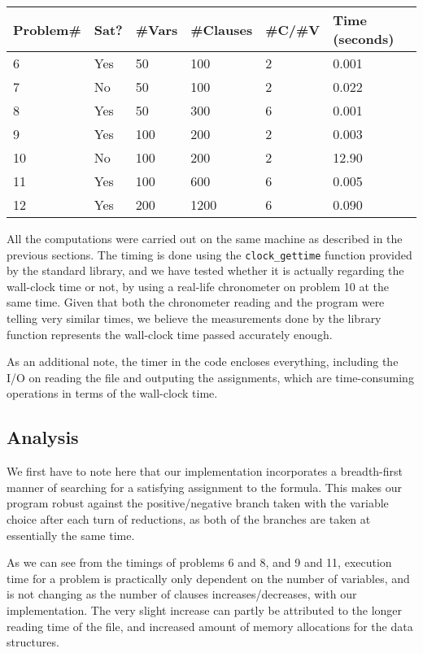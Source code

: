 \documentclass{article}
\begin{document}
\begin{center}
    \begin{tabular}{l || l | l | l | l || l}
    Problem\#  & Sat? & \#Vars & \#Clauses & \#C/\#V & Time (seconds) \\\hline
    6          & Yes  & 50     & 100       & 2       & 0.001 \\
    7          & No   & 50     & 100       & 2       & 0.022 \\
    8          & Yes  & 50     & 300       & 6       & 0.001 \\
    9          & Yes  & 100    & 200       & 2       & 0.003 \\
    10         & No   & 100    & 200       & 2       & 12.90 \\
    11         & Yes  & 100    & 600       & 6       & 0.005 \\
    12         & Yes  & 200    & 1200      & 6       & 0.090
    \end{tabular}
\end{center}

All the computations were carried out on the same machine as
described in the previous sections. The timing is done using
the \texttt{clock\_gettime} function provided by the standard
library, and we have tested whether it is actually regarding
the wall-clock time or not, by using a real-life chronometer
on problem 10 at the same time. Given that both the chronometer
reading and the program were telling very similar times, we
believe the measurements done by the library function represents
the wall-clock time passed accurately enough.

As an additional note, the timer in the code encloses everything,
including the I/O on reading the file and outputing the assignments,
which are time-consuming operations in terms of the wall-clock time.

\subsection{Analysis}

We first have to note here that our implementation incorporates
a breadth-first manner of searching for a satisfying assignment
to the formula. This makes our program robust against the
positive/negative branch taken with the variable choice
after each turn of reductions, as both of the branches are
taken at essentially the same time.

As we can see from the timings of problems 6 and 8, and 9 and 11,
execution time for a problem is practically only dependent on
the number of variables, and is not changing as the number of clauses
increases/decreases, with our implementation. The very slight
increase can partly be attributed to the longer reading time
of the file, and increased amount of memory allocations for the
data structures.
\end{document}
